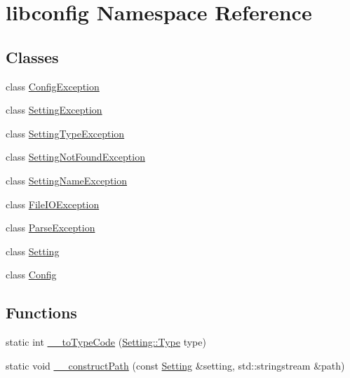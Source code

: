 \hypertarget{namespacelibconfig}{\section{libconfig Namespace Reference}
\label{namespacelibconfig}
}
\subsection*{Classes}
\begin{DoxyCompactItemize}
\item 
class \hyperlink{classlibconfig_1_1ConfigException}{Config\-Exception}
\item 
class \hyperlink{classlibconfig_1_1SettingException}{Setting\-Exception}
\item 
class \hyperlink{classlibconfig_1_1SettingTypeException}{Setting\-Type\-Exception}
\item 
class \hyperlink{classlibconfig_1_1SettingNotFoundException}{Setting\-Not\-Found\-Exception}
\item 
class \hyperlink{classlibconfig_1_1SettingNameException}{Setting\-Name\-Exception}
\item 
class \hyperlink{classlibconfig_1_1FileIOException}{File\-I\-O\-Exception}
\item 
class \hyperlink{classlibconfig_1_1ParseException}{Parse\-Exception}
\item 
class \hyperlink{classlibconfig_1_1Setting}{Setting}
\item 
class \hyperlink{classlibconfig_1_1Config}{Config}
\end{DoxyCompactItemize}
\subsection*{Functions}
\begin{DoxyCompactItemize}
\item 
static int \hyperlink{namespacelibconfig_a8e110477bf88dac91c60df3cc4e7eebe}{\-\_\-\-\_\-to\-Type\-Code} (\hyperlink{classlibconfig_1_1Setting_a42f760ff88654e784477a6f040267bb4}{Setting\-::\-Type} type)
\item 
static void \hyperlink{namespacelibconfig_ac6ddf54284dd0e8344d0e64a61cf9f17}{\-\_\-\-\_\-construct\-Path} (const \hyperlink{classlibconfig_1_1Setting}{Setting} \&setting, std\-::stringstream \&path)
\end{DoxyCompactItemize}


